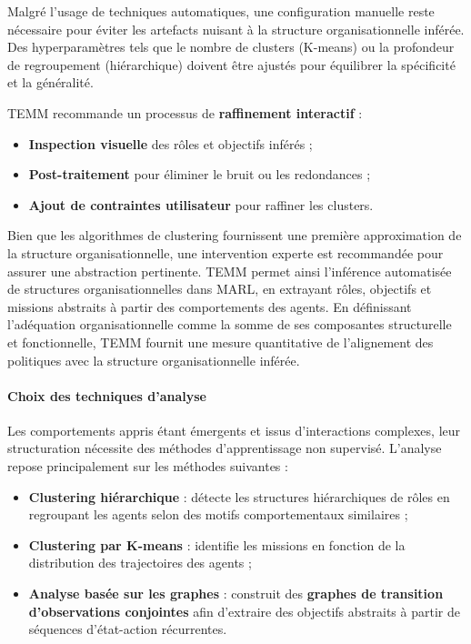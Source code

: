 Malgré l'usage de techniques automatiques, une configuration manuelle reste nécessaire pour éviter les artefacts nuisant à la structure organisationnelle inférée. Des hyperparamètres tels que le nombre de clusters (K-means) ou la profondeur de regroupement (hiérarchique) doivent être ajustés pour équilibrer la spécificité et la généralité.

TEMM recommande un processus de \textbf{raffinement interactif} :
\begin{itemize}
    \item \textbf{Inspection visuelle} des rôles et objectifs inférés ;
    \item \textbf{Post-traitement} pour éliminer le bruit ou les redondances ;
    \item \textbf{Ajout de contraintes utilisateur} pour raffiner les clusters.
\end{itemize}

Bien que les algorithmes de clustering fournissent une première approximation de la structure organisationnelle, une intervention experte est recommandée pour assurer une abstraction pertinente.  
TEMM permet ainsi l'inférence automatisée de structures organisationnelles dans MARL, en extrayant rôles, objectifs et missions abstraits à partir des comportements des agents.  
En définissant l'adéquation organisationnelle comme la somme de ses composantes structurelle et fonctionnelle, TEMM fournit une mesure quantitative de l'alignement des politiques avec la structure organisationnelle inférée.

\paragraph{Choix des techniques d'analyse}

Les comportements appris étant émergents et issus d'interactions complexes, leur structuration nécessite des méthodes d'apprentissage non supervisé. L'analyse repose principalement sur les méthodes suivantes :

\begin{itemize}
    \item \textbf{Clustering hiérarchique} : détecte les structures hiérarchiques de rôles en regroupant les agents selon des motifs comportementaux similaires ;
    \item \textbf{Clustering par K-means} : identifie les missions en fonction de la distribution des trajectoires des agents ;
    \item \textbf{Analyse basée sur les graphes} : construit des \textbf{graphes de transition d'observations conjointes} afin d'extraire des objectifs abstraits à partir de séquences d'état-action récurrentes.
\end{itemize}

